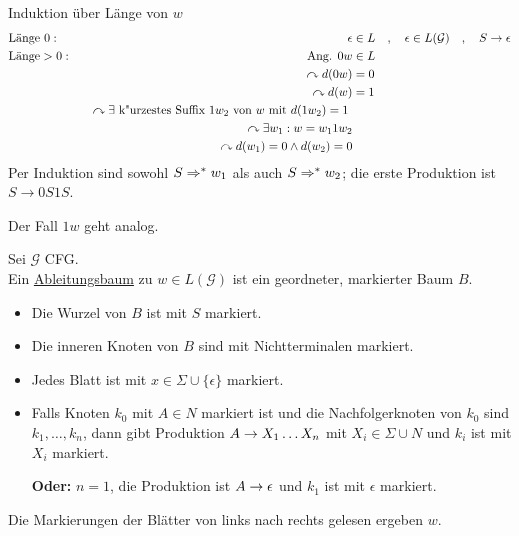 Induktion über Länge von $w$
\begin{alignat*}{2}
	&\text{Länge }0:\quad& \epsilon &\in L
		\quad,\quad \epsilon \in L(\mathcal{G})
		\quad,\quad S \-> \epsilon\\
	&\text{Länge}>0:\quad& \text{Ang. } 0w&\in L\\
	&&\curvearrowright d(0w) &= 0\\
	&&\curvearrowright d(w) &= 1 \\
	&&\curvearrowright \exists \text{ k"urzestes Suffix $1w_2$ von $w$ mit $d(1w_2)=1$ }\\
	&&\curvearrowright \exists w_1 : w=w_1 1 w_2\\
	&&\curvearrowright d(w_1)=0 \wedge d(w_2)=0
\end{alignat*}
Per Induktion sind sowohl $S \=>^*w_1$ als auch $S\=>^*w_2$; die erste Produktion ist
$S \to 0S1S$.

Der Fall $1w$ geht analog.


\begin{Def}[name={[Ableitungsbaum]}] Sei $\mathcal{G}$ \ac{CFG}.\\
	Ein \uline{Ableitungsbaum} zu $w\in L(\mathcal{G})$ ist ein geordneter, markierter Baum $B$.
	\begin{itemize}
	\item Die Wurzel von $B$ ist mit $S$ markiert.
	\item Die inneren Knoten von $B$ sind mit Nichtterminalen markiert.
	\item Jedes Blatt ist mit $x\in\Sigma\cup\{\epsilon\}$ markiert.
	\item Falls Knoten $k_0$ mit $A\in N$ markiert ist und die  Nachfolgerknoten von $k_0$ sind $k_1,\dots, k_n$, dann gibt Produktion $A\-> X_1\dots X_n$ mit $X_i\in\Sigma\cup N$ und $k_i$ ist mit $X_i$ markiert.
	
	\textbf{Oder:} $n=1$, die Produktion ist $A\->\epsilon$ und $k_1$ ist mit $\epsilon$ markiert.
	\end{itemize}
	Die Markierungen der Blätter von links nach rechts gelesen ergeben $w$.
\end{Def}

